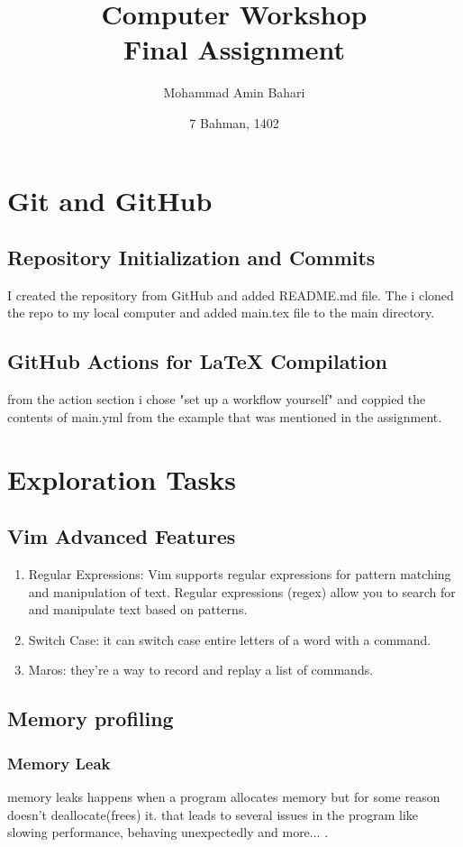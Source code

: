 \documentclass[titlepage]{article}
\title{Computer Workshop \\ Final Assignment}
\author{Mohammad Amin Bahari}
\date{7 Bahman, 1402}
\begin{document}
\maketitle

\tableofcontents
\newpage
\section{Git and GitHub}

\subsection{Repository Initialization and Commits}
I created the repository from GitHub and added README.md file.
The i cloned the repo to my local computer and added main.tex file to the main directory.

\subsection{GitHub Actions for LaTeX Compilation}
from the action section i chose "set up a workflow yourself" and coppied the contents of main.yml from the example that was mentioned in the assignment.

\section{Exploration Tasks}

\subsection{Vim Advanced Features}
\begin{enumerate}
    \item Regular Expressions: Vim supports regular expressions for pattern matching and manipulation of text. Regular expressions (regex) allow you to search for and manipulate text based on patterns.
    \item Switch Case: it can switch case entire letters of a word with a command.
    \item Maros: they're a way to record and replay a list of commands.
\end{enumerate}

\subsection{Memory profiling}
\subsubsection{Memory Leak}
memory leaks happens when a program allocates memory but for some reason doesn't deallocate(frees) it. that leads to several issues in the program like slowing performance, behaving unexpectedly and more... .
\end{document}
